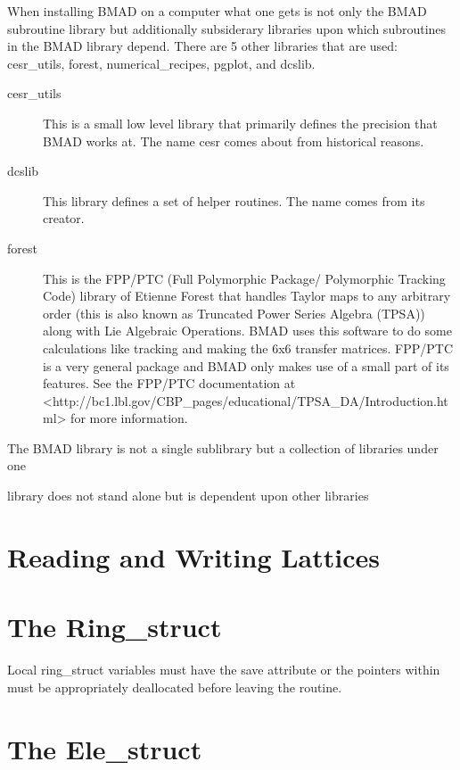 \documentclass{book}
\begin{document}
When installing BMAD on a computer what one gets is not only the BMAD
subroutine library but additionally subsiderary libraries upon which
subroutines in the BMAD library depend. There are 5 other libraries
that are used: cesr_utils, forest, numerical_recipes, pgplot, and dcslib.
\begin{description}
\item[cesr_utils] This is a small low level library that primarily defines 
the precision that BMAD works at. The name cesr comes about from
historical reasons.
\item[dcslib] This library defines a set of helper routines. 
The name comes from its creator.
\item[forest] This is the FPP/PTC 
(Full Polymorphic Package/ Polymorphic Tracking Code) library of
Etienne Forest that handles Taylor maps to any arbitrary order (this
is also known as Truncated Power Series Algebra (TPSA)) along with Lie
Algebraic Operations. BMAD uses this software to do some calculations
like tracking and making the 6x6 transfer matrices. FPP/PTC is a very
general package and BMAD only makes use of a small part of its
features. See the FPP/PTC documentation at
<http://bc1.lbl.gov/CBP_pages/educational/TPSA_DA/Introduction.html>
for more information.
\end{description}


The BMAD library is not a single sublibrary but a collection of
libraries under one

library does not stand alone but is dependent upon other
libraries

\chapter{Reading and Writing Lattices}

\chapter{The Ring\_struct}

Local ring_struct variables must have the save attribute or
the pointers within must be appropriately deallocated
before leaving the routine.

\chapter{The Ele\_struct}
\end{document}
